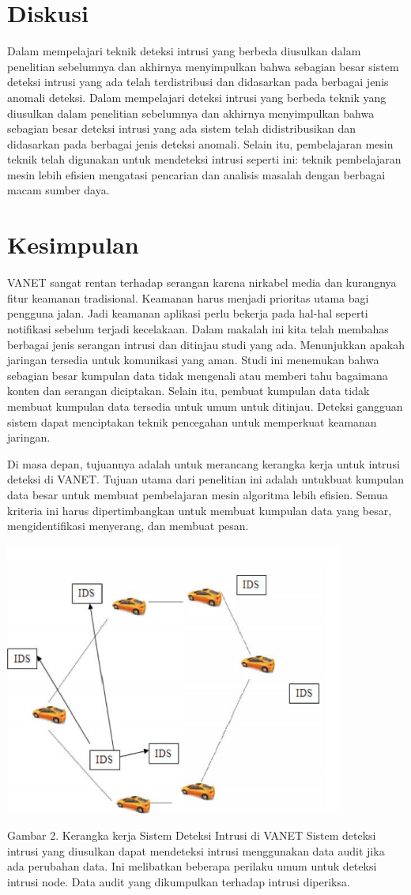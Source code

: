 \documentclass[conference]{IEEEtran}
\begin{document}
\section{Diskusi}
Dalam mempelajari teknik deteksi intrusi yang berbeda
diusulkan dalam penelitian sebelumnya dan akhirnya menyimpulkan bahwa
sebagian besar sistem deteksi intrusi yang ada telah
terdistribusi dan didasarkan pada berbagai jenis anomali
deteksi. Dalam mempelajari deteksi intrusi yang berbeda
teknik yang diusulkan dalam penelitian sebelumnya dan akhirnya
menyimpulkan bahwa sebagian besar deteksi intrusi yang ada
sistem telah didistribusikan dan didasarkan pada berbagai
jenis deteksi anomali. Selain itu, pembelajaran mesin
teknik telah digunakan untuk mendeteksi intrusi seperti ini:
teknik pembelajaran mesin lebih efisien mengatasi
pencarian dan analisis masalah dengan berbagai macam sumber daya.

\section{Kesimpulan}
VANET sangat rentan terhadap serangan karena nirkabel
media dan kurangnya fitur keamanan tradisional. Keamanan
harus menjadi prioritas utama bagi pengguna jalan. Jadi keamanan
aplikasi perlu bekerja pada hal-hal seperti notifikasi
sebelum terjadi kecelakaan. Dalam makalah ini kita telah membahas
berbagai jenis serangan intrusi dan ditinjau
studi yang ada. Menunjukkan apakah jaringan tersedia
untuk komunikasi yang aman. Studi ini menemukan bahwa sebagian besar
kumpulan data tidak mengenali atau memberi tahu bagaimana konten dan serangan
diciptakan. Selain itu, pembuat kumpulan data tidak membuat
kumpulan data tersedia untuk umum untuk ditinjau. Deteksi gangguan
sistem dapat menciptakan teknik pencegahan untuk memperkuat
keamanan jaringan.

Di masa depan, tujuannya adalah untuk merancang kerangka kerja untuk intrusi
deteksi di VANET. Tujuan utama dari penelitian ini adalah untukbuat kumpulan data besar untuk membuat pembelajaran mesin
algoritma lebih efisien. Semua kriteria ini harus
dipertimbangkan untuk membuat kumpulan data yang besar, mengidentifikasi
menyerang, dan membuat pesan.



\begin{center}
\includegraphics[width=.5\textwidth]{gambar/tugas7-2.PNG}
\end{center}
Gambar 2. Kerangka kerja Sistem Deteksi Intrusi di VANET
Sistem deteksi intrusi yang diusulkan dapat mendeteksi
intrusi menggunakan data audit jika ada perubahan data. Ini
melibatkan beberapa perilaku umum untuk deteksi intrusi
node. Data audit yang dikumpulkan terhadap intrusi diperiksa.
\end{document}
